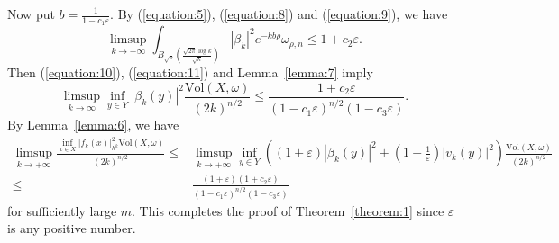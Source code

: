 \documentclass[12pt,oneside]{amsart}
\theoremstyle{plain}
\theoremstyle{definition}
\theoremstyle{remark}
\begin{document}
Now put $b = \frac{1}{1-c_{1}\varepsilon}$.  
By (\ref{equation:5}), (\ref{equation:8}) and (\ref{equation:9}), we have 
\[
\limsup_{k \to +\infty}\int_{B_{\sqrt{\rho}}(\frac{\sqrt{2\pi} \log k}{\sqrt{k}})} |\beta_{k}|^2 e^{-kb \rho} \omega_{\rho, n} \leq 1 + c_{2}\varepsilon.  
\]
Then (\ref{equation:10}), (\ref{equation:11}) and Lemma~\ref{lemma:7} imply 
\[
\limsup_{k \to \infty} \inf_{y \in Y} |\beta_{k}(y)|^2 \frac{\mathrm{Vol}(X, \omega)}{(2k)^{n/2}} \leq \frac{1 + c_2 \varepsilon}{(1-c_1 \varepsilon)^{n/2}(1-c_3 \varepsilon)}.  
\]
By Lemma~\ref{lemma:6}, we have 
\begin{align*}
\limsup_{k \to +\infty}\frac{\inf_{x \in X}|f_k(x)|^2_{h^k}\mathrm{Vol}(X, \omega)}{(2k)^{n/2}} \leq &\limsup_{k \to +\infty}\inf_{y \in Y} \left((1+ \varepsilon) |\beta_k(y)|^2 + \left(1 + \frac{1}{\varepsilon} \right)|v_{k}(y)|^2\right) \frac{\mathrm{Vol}(X, \omega)}{(2k)^{n/2}} \\
\leq & \frac{(1 + \varepsilon)(1+c_2 \varepsilon)}{(1-c_1 \varepsilon)^{n/2}(1-c_3\varepsilon)}
\end{align*}
for sufficiently large $m$.  
This completes the proof of Theorem~\ref{theorem:1} since $\varepsilon$ is any positive number.  
\end{document}
